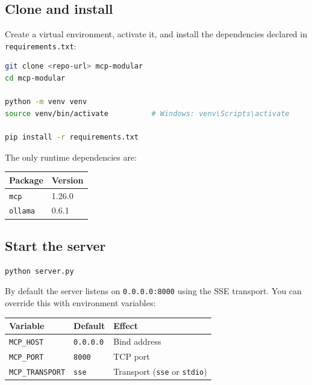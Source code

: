 \documentclass[11pt, a4paper]{article}
\begin{document}
\subsection{Clone and install}

Create a virtual environment, activate it, and install the dependencies declared in \texttt{requirements.txt}:

\begin{lstlisting}[language=bash, style=python, numbers=none]
git clone <repo-url> mcp-modular
cd mcp-modular

python -m venv venv
source venv/bin/activate          # Windows: venv\Scripts\activate

pip install -r requirements.txt
\end{lstlisting}

The only runtime dependencies are:

\begin{center}
\begin{tabular}{ll}
\toprule
Package & Version \\
\midrule
\texttt{mcp} & 1.26.0 \\
\texttt{ollama} & 0.6.1 \\
\bottomrule
\end{tabular}
\end{center}

\subsection{Start the server}

\begin{lstlisting}[language=bash, style=python, numbers=none]
python server.py
\end{lstlisting}

By default the server listens on \texttt{0.0.0.0:8000} using the SSE transport. You can override this with environment variables:

\begin{center}
\begin{tabular}{lll}
\toprule
Variable & Default & Effect \\
\midrule
\texttt{MCP\_HOST} & \texttt{0.0.0.0} & Bind address \\
\texttt{MCP\_PORT} & \texttt{8000} & TCP port \\
\texttt{MCP\_TRANSPORT} & \texttt{sse} & Transport (\texttt{sse} or \texttt{stdio}) \\
\bottomrule
\end{tabular}
\end{center}
\end{document}
